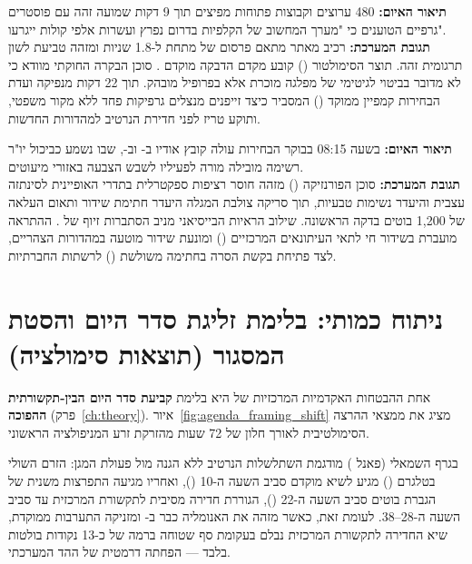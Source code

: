 \begin{archbox}
\textbf{תיאור האיום:} 480 ערוצים וקבוצות פתוחות מפיצים תוך 9 דקות שמועה זהה עם פוסטרים גרפיים הטוענים כי "מערך המחשוב של הקלפיות בדרום נפרץ ועשרות אלפי קולות ייגרעו".\\
\textbf{תגובת המערכת:} רכיב  מאתר מתאם פרסום של מתחת ל-1.8 שניות ומזהה טביעת לשון תרגומית זהה. תוצר הסימולטור () קובע מקדם הדבקה מוקדם . סוכן הבקרה החוקתי מוודא כי לא מדובר בביטוי לגיטימי של מפלגה מוכרת אלא בפרופיל  מובהק. תוך 22 דקות מנפיקה ועדת הבחירות קמפיין  ממוקד () המסביר כיצד זייפנים מנצלים גרפיקות פחד ללא מקור משפטי, ותוקע טריז לפני חדירת הנרטיב למהדורות החדשות.
\end{archbox}

\begin{archbox}
\textbf{תיאור האיום:} בשעה 08:15 בבוקר הבחירות עולה קובץ אודיו ב- וב-, שבו נשמע כביכול יו"ר רשימה מובילה מורה לפעיליו לשבש הצבעה באזורי מיעוטים.\\
\textbf{תגובת המערכת:} סוכן הפורנזיקה () מזהה חוסר רציפות ספקטרלית בתדרי  האופיינית לסינתזה עצבית והיעדר נשימות טבעיות, תוך סריקה צולבת המגלה היעדר חתימת שידור  ותאום העלאה של 1,200 בוטים בדקה הראשונה. שילוב הראיות הבייסיאני מניב הסתברות זיוף של . ההתראה מועברת בשידור חי לתאי העיתונאים המרכזיים () ומונעת שידור מוטעה במהדורות הצהריים, לצד פתיחת בקשת הסרה בחתימה משולשת () לרשתות החברתיות.
\end{archbox}

\section{ניתוח כמותי: בלימת זליגת סדר היום והסטת המסגור (תוצאות סימולציה)}
אחת ההבטחות האקדמיות המרכזיות של  היא בלימת \textbf{קביעת סדר היום הבין-תקשורתית ההפוכה} (פרק~\ref{ch:theory}). איור~\ref{fig:agenda_framing_shift} מציג את ממצאי ההרצה הסימולטיבית לאורך חלון של 72 שעות מהזרקת זרע המניפולציה הראשוני.

בגרף השמאלי (פאנל ) מודגמת השתלשלות הנרטיב ללא הגנה מול פעולת המגן: הזרם השולי בטלגרם () מגיע לשיא מוקדם סביב השעה ה-10 (), ואחריו מגיעה התפרצות משנית של הגברת בוטים סביב השעה ה-22 (), הגוררת חדירה מסיבית לתקשורת המרכזית עד סביב השעה ה-28–38. לעומת זאת, כאשר  מזהה את האנומליה כבר ב- ומזניקה התערבות  ממוקדת, שיא החדירה לתקשורת המרכזית נבלם בעקומת סף שטוחה ברמה של כ-13 נקודות בולטות בלבד — הפחתה דרמטית של ההד המערכתי.

